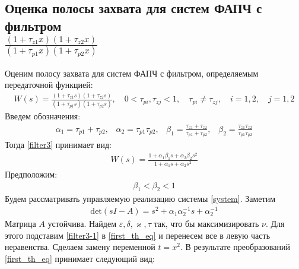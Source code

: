 \documentclass[a4paper,14pt]{article} %
\begin{document}
\pagebreak
\subsection{Оценка полосы захвата для систем ФАПЧ с фильтром \\ $\frac{(1+\tau_{z1}x)(1+\tau_{z2}x)}{(1+\tau_{p1}x)(1+\tau_{p2}x)}$}
Оценим полосу захвата для систем ФАПЧ с фильтром, определяемым передаточной функцией:
 \begin{equation}\label{filter3}
 \begin{aligned}
W(s) = \frac{(1+\tau_{z1}s)(1+\tau_{z2}s)}{(1+\tau_{p1}s)(1+\tau_{p2}s)}, \quad 0<\tau_{pi},\tau_{zj} < 1, \quad \tau_{pi} \neq \tau_{zj}, \quad i=1,2, \quad j=1,2
 \end{aligned}
\end{equation}
Введем обозначения:
 \begin{equation}
 \begin{aligned}
\alpha_1 = \tau_{p1} + \tau_{p2}\text{,}\quad 
\alpha_2 = \tau_{p1}\tau_{p2}\text{,}\quad 
\beta_1 = \frac{\tau_{z1}+\tau_{z2}}{\tau_{p1}+\tau_{p2}}\text{,}\quad 
\beta_2 = \frac{\tau_{z1}\tau_{z2}}{\tau_{p1}\tau_{p2}}
 \end{aligned}
\end{equation}
Тогда \eqref{filter3} принимает вид:
 \begin{equation}\label{filter3-1}
 \begin{aligned}
W(s) = \frac{1+\alpha_1\beta_1s + \alpha_2\beta_2s^2}{1+\alpha_1s + \alpha_2s^2}
 \end{aligned}
\end{equation}
Предположим:
 \begin{equation}\label{restriction-1}
 \begin{aligned}
\beta_1 < \beta_2 < 1
 \end{aligned}
\end{equation}
Будем рассматривать управляемую реализацию системы \eqref{system}. Заметим
 \begin{equation}
 \begin{aligned}
\text{det}(sI-A) = s^2 + \alpha_1\alpha_2^{-1}s + \alpha_2^{-1}
 \end{aligned}
\end{equation}
Матрица $A$ устойчива. Найдем $\varepsilon, \delta, \varkappa, \tau$ так, что бы максимизировать $\nu$. Для этого подставим \eqref{filter3-1} в \eqref{first_th_eq} и перенесем все в левую часть неравенства. Сделаем замену переменной $t = x^2$. В результате преобразований \eqref{first_th_eq} принимает следующий вид:
\end{document}
